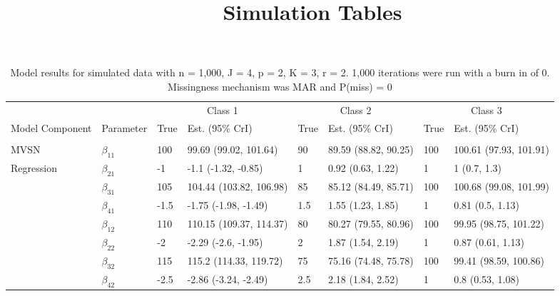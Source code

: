 \documentclass[]{article}
\title{Simulation Tables}
\author{}
\date{}
\begin{document}
\maketitle

\begin{table}[t]

\caption{\label{tab:unnamed-chunk-5}Model results for simulated data with n = 1,000, J = 4, p = 2, K = 3, r = 2. 1,000 iterations were run with a burn in of 0. Missingness mechanism was MAR and P(miss) = 0}
\centering
\fontsize{8}{10}\selectfont
\begin{tabular}{llllllll}
\toprule
\multicolumn{2}{c}{ } & \multicolumn{2}{c}{Class 1} & \multicolumn{2}{c}{Class 2} & \multicolumn{2}{c}{Class 3} \\
\cmidrule(l{3pt}r{3pt}){3-4} \cmidrule(l{3pt}r{3pt}){5-6} \cmidrule(l{3pt}r{3pt}){7-8}
Model Component & Parameter & True & Est. (95\% CrI) & True & Est. (95\% CrI) & True & Est. (95\% CrI)\\
\midrule
\addlinespace[0.3em]
\multicolumn{8}{l}{\textbf{ }}\\
\hspace{1em}MVSN & $\beta_{11}$ & 100 & 99.69 (99.02, 101.64) & 90 & 89.59 (88.82, 90.25) & 100 & 100.61 (97.93, 101.91)\\
\hspace{1em}Regression & $\beta_{21}$ & -1 & -1.1 (-1.32, -0.85) & 1 & 0.92 (0.63, 1.22) & 1 & 1 (0.7, 1.3)\\
\hspace{1em} & $\beta_{31}$ & 105 & 104.44 (103.82, 106.98) & 85 & 85.12 (84.49, 85.71) & 100 & 100.68 (99.08, 101.99)\\
\hspace{1em} & $\beta_{41}$ & -1.5 & -1.75 (-1.98, -1.49) & 1.5 & 1.55 (1.23, 1.85) & 1 & 0.81 (0.5, 1.13)\\
\hspace{1em} & $\beta_{12}$ & 110 & 110.15 (109.37, 114.37) & 80 & 80.27 (79.55, 80.96) & 100 & 99.95 (98.75, 101.22)\\
\hspace{1em} & $\beta_{22}$ & -2 & -2.29 (-2.6, -1.95) & 2 & 1.87 (1.54, 2.19) & 1 & 0.87 (0.61, 1.13)\\
\hspace{1em} & $\beta_{32}$ & 115 & 115.2 (114.33, 119.72) & 75 & 75.16 (74.48, 75.78) & 100 & 99.41 (98.59, 100.86)\\
\hspace{1em} & $\beta_{42}$ & -2.5 & -2.86 (-3.24, -2.49) & 2.5 & 2.18 (1.84, 2.52) & 1 & 0.8 (0.53, 1.08)\\

\end{tabular}
\end{table}
\end{document}
